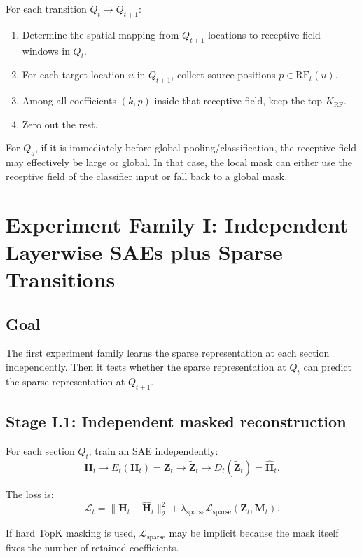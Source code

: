 \documentclass[11pt]{article}
\newcommand{\Htens}{\mathbf{H}}
\newcommand{\Ztens}{\mathbf{Z}}
\newcommand{\Mtens}{\mathbf{M}}
\newcommand{\Hhat}{\widehat{\mathbf{H}}}
\newcommand{\Ztilde}{\widetilde{\mathbf{Z}}}
\begin{document}
For each transition \(Q_t \rightarrow Q_{t+1}\):

\begin{enumerate}[leftmargin=*]
    \item Determine the spatial mapping from \(Q_{t+1}\) locations to receptive-field windows in \(Q_t\).
    \item For each target location \(u\) in \(Q_{t+1}\), collect source positions \(p \in \mathrm{RF}_t(u)\).
    \item Among all coefficients \((k,p)\) inside that receptive field, keep the top \(K_{\mathrm{RF}}\).
    \item Zero out the rest.
\end{enumerate}

For \(Q_5\), if it is immediately before global pooling/classification, the receptive field may effectively be large or global. In that case, the local mask can either use the receptive field of the classifier input or fall back to a global mask.

\section{Experiment Family I: Independent Layerwise SAEs plus Sparse Transitions}

\subsection{Goal}

The first experiment family learns the sparse representation at each section independently. Then it tests whether the sparse representation at \(Q_t\) can predict the sparse representation at \(Q_{t+1}\).

\subsection{Stage I.1: Independent masked reconstruction}

For each section \(Q_t\), train an SAE independently:
\[
\Htens_t
\rightarrow
E_t(\Htens_t)=\Ztens_t
\rightarrow
\Ztilde_t
\rightarrow
D_t(\Ztilde_t)=\Hhat_t.
\]

The loss is:
\[
\mathcal{L}_{t}
=
\|\Htens_t - \Hhat_t\|_2^2
+
\lambda_{\mathrm{sparse}} \mathcal{L}_{\mathrm{sparse}}(\Ztens_t,\Mtens_t).
\]

If hard TopK masking is used, \(\mathcal{L}_{\mathrm{sparse}}\) may be implicit because the mask itself fixes the number of retained coefficients.
\end{document}
